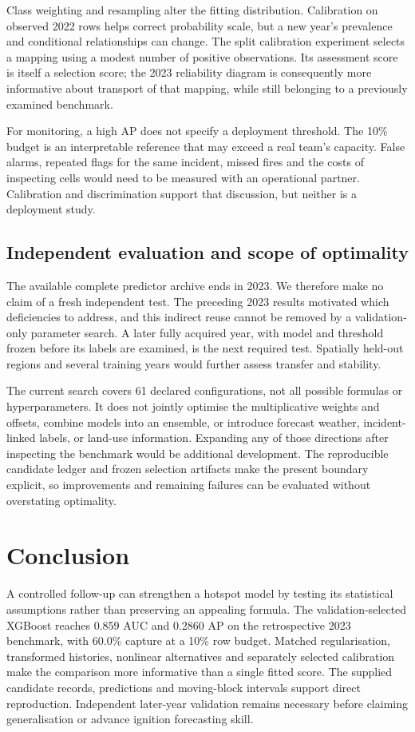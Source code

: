 \documentclass[conference]{IEEEtran}
\begin{document}
Class weighting and resampling alter the fitting distribution. Calibration on observed 2022 rows helps correct probability scale, but a new year's prevalence and conditional relationships can change. The split calibration experiment selects a mapping using a modest number of positive observations. Its assessment score is itself a selection score; the 2023 reliability diagram is consequently more informative about transport of that mapping, while still belonging to a previously examined benchmark.

For monitoring, a high AP does not specify a deployment threshold. The 10\% budget is an interpretable reference that may exceed a real team's capacity. False alarms, repeated flags for the same incident, missed fires and the costs of inspecting cells would need to be measured with an operational partner. Calibration and discrimination support that discussion, but neither is a deployment study.

\subsection{Independent evaluation and scope of optimality}
The available complete predictor archive ends in 2023. We therefore make no claim of a fresh independent test. The preceding 2023 results motivated which deficiencies to address, and this indirect reuse cannot be removed by a validation-only parameter search. A later fully acquired year, with model and threshold frozen before its labels are examined, is the next required test. Spatially held-out regions and several training years would further assess transfer and stability.

The current search covers 61 declared configurations, not all possible formulas or hyperparameters. It does not jointly optimise the multiplicative weights and offsets, combine models into an ensemble, or introduce forecast weather, incident-linked labels, or land-use information. Expanding any of those directions after inspecting the benchmark would be additional development. The reproducible candidate ledger and frozen selection artifacts make the present boundary explicit, so improvements and remaining failures can be evaluated without overstating optimality.

\section{Conclusion}
A controlled follow-up can strengthen a hotspot model by testing its statistical assumptions rather than preserving an appealing formula. The validation-selected XGBoost reaches 0.859 AUC and 0.2860 AP on the retrospective 2023 benchmark, with 60.0\% capture at a 10\% row budget. Matched regularisation, transformed histories, nonlinear alternatives and separately selected calibration make the comparison more informative than a single fitted score. The supplied candidate records, predictions and moving-block intervals support direct reproduction. Independent later-year validation remains necessary before claiming generalisation or advance ignition forecasting skill.
\end{document}
